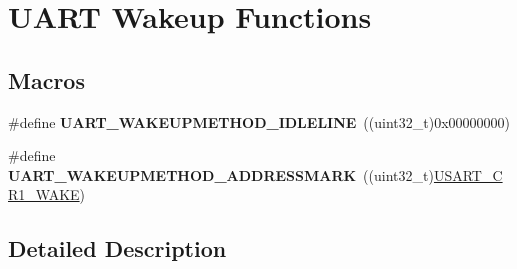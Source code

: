 \hypertarget{group___u_a_r_t___wake_up__functions}{\section{U\-A\-R\-T Wakeup Functions}
\label{group___u_a_r_t___wake_up__functions}
}
\subsection*{Macros}
\begin{DoxyCompactItemize}
\item 
\hypertarget{group___u_a_r_t___wake_up__functions_ga2411ed44c5d82db84c5819e1e2b5b8b3}{\#define {\bfseries U\-A\-R\-T\-\_\-\-W\-A\-K\-E\-U\-P\-M\-E\-T\-H\-O\-D\-\_\-\-I\-D\-L\-E\-L\-I\-N\-E}~((uint32\-\_\-t)0x00000000)}\label{group___u_a_r_t___wake_up__functions_ga2411ed44c5d82db84c5819e1e2b5b8b3}

\item 
\hypertarget{group___u_a_r_t___wake_up__functions_ga4c6935f26f8f2a9fe70fd6306a9882cb}{\#define {\bfseries U\-A\-R\-T\-\_\-\-W\-A\-K\-E\-U\-P\-M\-E\-T\-H\-O\-D\-\_\-\-A\-D\-D\-R\-E\-S\-S\-M\-A\-R\-K}~((uint32\-\_\-t)\hyperlink{group___peripheral___registers___bits___definition_gad831dfc169fcf14b7284984dbecf322d}{U\-S\-A\-R\-T\-\_\-\-C\-R1\-\_\-\-W\-A\-K\-E})}\label{group___u_a_r_t___wake_up__functions_ga4c6935f26f8f2a9fe70fd6306a9882cb}

\end{DoxyCompactItemize}


\subsection{Detailed Description}
